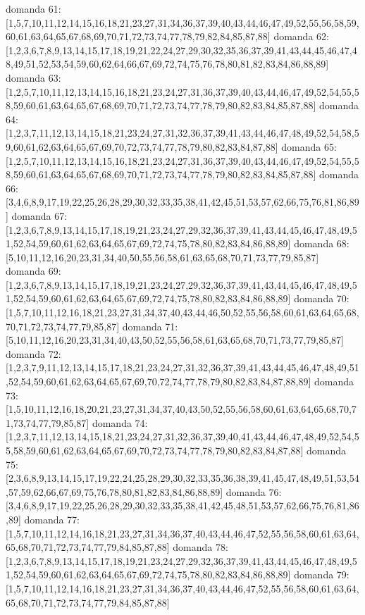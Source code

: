 domanda 61:[1,5,7,10,11,12,14,15,16,18,21,23,27,31,34,36,37,39,40,43,44,46,47,49,52,55,56,58,59,60,61,63,64,65,67,68,69,70,71,72,73,74,77,78,79,82,84,85,87,88]
domanda 62:[1,2,3,6,7,8,9,13,14,15,17,18,19,21,22,24,27,29,30,32,35,36,37,39,41,43,44,45,46,47,48,49,51,52,53,54,59,60,62,64,66,67,69,72,74,75,76,78,80,81,82,83,84,86,88,89]
domanda 63:[1,2,5,7,10,11,12,13,14,15,16,18,21,23,24,27,31,36,37,39,40,43,44,46,47,49,52,54,55,58,59,60,61,63,64,65,67,68,69,70,71,72,73,74,77,78,79,80,82,83,84,85,87,88]
domanda 64:[1,2,3,7,11,12,13,14,15,18,21,23,24,27,31,32,36,37,39,41,43,44,46,47,48,49,52,54,58,59,60,61,62,63,64,65,67,69,70,72,73,74,77,78,79,80,82,83,84,87,88]
domanda 65:[1,2,5,7,10,11,12,13,14,15,16,18,21,23,24,27,31,36,37,39,40,43,44,46,47,49,52,54,55,58,59,60,61,63,64,65,67,68,69,70,71,72,73,74,77,78,79,80,82,83,84,85,87,88]
domanda 66:[3,4,6,8,9,17,19,22,25,26,28,29,30,32,33,35,38,41,42,45,51,53,57,62,66,75,76,81,86,89]
domanda 67:[1,2,3,6,7,8,9,13,14,15,17,18,19,21,23,24,27,29,32,36,37,39,41,43,44,45,46,47,48,49,51,52,54,59,60,61,62,63,64,65,67,69,72,74,75,78,80,82,83,84,86,88,89]
domanda 68:[5,10,11,12,16,20,23,31,34,40,50,55,56,58,61,63,65,68,70,71,73,77,79,85,87]
domanda 69:[1,2,3,6,7,8,9,13,14,15,17,18,19,21,23,24,27,29,32,36,37,39,41,43,44,45,46,47,48,49,51,52,54,59,60,61,62,63,64,65,67,69,72,74,75,78,80,82,83,84,86,88,89]
domanda 70:[1,5,7,10,11,12,16,18,21,23,27,31,34,37,40,43,44,46,50,52,55,56,58,60,61,63,64,65,68,70,71,72,73,74,77,79,85,87]
domanda 71:[5,10,11,12,16,20,23,31,34,40,43,50,52,55,56,58,61,63,65,68,70,71,73,77,79,85,87]
domanda 72:[1,2,3,7,9,11,12,13,14,15,17,18,21,23,24,27,31,32,36,37,39,41,43,44,45,46,47,48,49,51,52,54,59,60,61,62,63,64,65,67,69,70,72,74,77,78,79,80,82,83,84,87,88,89]
domanda 73:[1,5,10,11,12,16,18,20,21,23,27,31,34,37,40,43,50,52,55,56,58,60,61,63,64,65,68,70,71,73,74,77,79,85,87]
domanda 74:[1,2,3,7,11,12,13,14,15,18,21,23,24,27,31,32,36,37,39,40,41,43,44,46,47,48,49,52,54,55,58,59,60,61,62,63,64,65,67,69,70,72,73,74,77,78,79,80,82,83,84,87,88]
domanda 75:[2,3,6,8,9,13,14,15,17,19,22,24,25,28,29,30,32,33,35,36,38,39,41,45,47,48,49,51,53,54,57,59,62,66,67,69,75,76,78,80,81,82,83,84,86,88,89]
domanda 76:[3,4,6,8,9,17,19,22,25,26,28,29,30,32,33,35,38,41,42,45,48,51,53,57,62,66,75,76,81,86,89]
domanda 77:[1,5,7,10,11,12,14,16,18,21,23,27,31,34,36,37,40,43,44,46,47,52,55,56,58,60,61,63,64,65,68,70,71,72,73,74,77,79,84,85,87,88]
domanda 78:[1,2,3,6,7,8,9,13,14,15,17,18,19,21,23,24,27,29,32,36,37,39,41,43,44,45,46,47,48,49,51,52,54,59,60,61,62,63,64,65,67,69,72,74,75,78,80,82,83,84,86,88,89]
domanda 79:[1,5,7,10,11,12,14,16,18,21,23,27,31,34,36,37,40,43,44,46,47,52,55,56,58,60,61,63,64,65,68,70,71,72,73,74,77,79,84,85,87,88]
